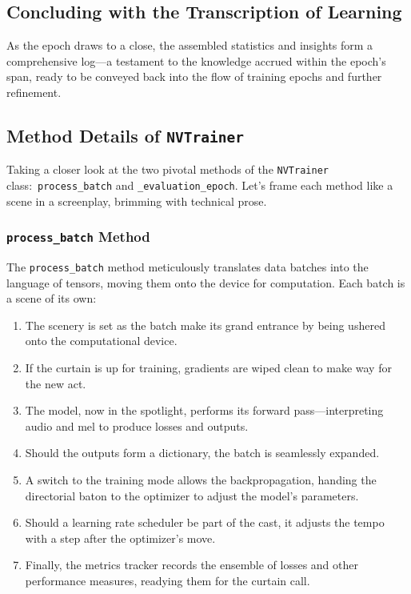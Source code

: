 \documentclass[a4paper]{article}
\begin{document}
\subsection{Concluding with the Transcription of Learning}

As the epoch draws to a close, the assembled statistics and insights form a comprehensive log—a testament to the knowledge accrued within the epoch's span, ready to be conveyed back into the flow of training epochs and further refinement.




\subsection{Method Details of \texttt{NVTrainer}}

Taking a closer look at the two pivotal methods of the \texttt{NVTrainer} class:\ \texttt{process\_batch} and \texttt{\_evaluation\_epoch}. Let's frame each method like a scene in a screenplay, brimming with technical prose.

\subsubsection{\texttt{process\_batch} Method}

The \texttt{process\_batch} method meticulously translates data batches into the language of tensors, moving them onto the device for computation. Each batch is a scene of its own:

\begin{enumerate}
  \item The scenery is set as the batch make its grand entrance by being ushered onto the computational device.
  \item If the curtain is up for training, gradients are wiped clean to make way for the new act.
  \item The model, now in the spotlight, performs its forward pass—interpreting audio and mel to produce losses and outputs.
  \item Should the outputs form a dictionary, the batch is seamlessly expanded.
  \item A switch to the training mode allows the backpropagation, handing the directorial baton to the optimizer to adjust the model’s parameters.
  \item Should a learning rate scheduler be part of the cast, it adjusts the tempo with a step after the optimizer's move.
  \item Finally, the metrics tracker records the ensemble of losses and other performance measures, readying them for the curtain call.
\end{enumerate}
\end{document}

